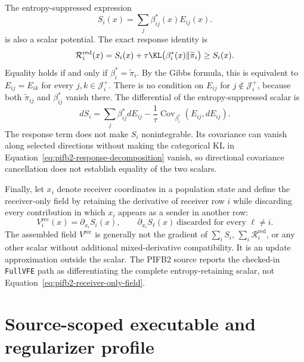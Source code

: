 The entropy-suppressed expression
\begin{equation}
S_i(x)=\sum_j\beta_{ij}^*(x)E_{ij}(x).
\label{eq:pifb2-entropy-suppressed-scalar}
\end{equation}
is also a scalar potential. The exact response identity is
\begin{equation}
\mathcal R_i^{\mathrm{red}}(x)
=S_i(x)+\tau\KL\bigl(\beta_i^*(x)\Vert\widetilde\pi_i\bigr)
\geq S_i(x).
\label{eq:pifb2-response-decomposition}
\end{equation}
Equality holds if and only if \(\beta_i^*=\widetilde\pi_i\). By the Gibbs formula, this is equivalent to \(E_{ij}=E_{ik}\) for every \(j,k\in\mathcal J_i^+\). There is no condition on \(E_{ij}\) for \(j\notin\mathcal J_i^+\), because both \(\widetilde\pi_{ij}\) and \(\beta_{ij}^*\) vanish there. The differential of the entropy-suppressed scalar is
\begin{equation}
dS_i
=\sum_j\beta_{ij}^*dE_{ij}
-\frac{1}{\tau}
\operatorname{Cov}_{\beta_i^*}(E_{ij},dE_{ij}).
\label{eq:pifb2-entropy-suppressed-differential}
\end{equation}
The response term does not make \(S_i\) nonintegrable. Its covariance can vanish along selected directions without making the categorical KL in Equation~\eqref{eq:pifb2-response-decomposition} vanish, so directional covariance cancellation does not establish equality of the two scalars.

Finally, let \(x_i\) denote receiver coordinates in a population state and define the receiver-only field by retaining the derivative of receiver row \(i\) while discarding every contribution in which \(x_i\) appears as a sender in another row:
\begin{equation}
V_i^{\mathrm{rec}}(x)
=\partial_{x_i}S_i(x),
\qquad
\partial_{x_i}S_\ell(x)\ \text{discarded for every \(\ell\neq i\)}.
\label{eq:pifb2-receiver-only-field}
\end{equation}
The assembled field \(V^{\mathrm{rec}}\) is generally not the gradient of \(\sum_iS_i\), \(\sum_i\mathcal R_i^{\mathrm{red}}\), or any other scalar without additional mixed-derivative compatibility. It is an update approximation outside the scalar. The PIFB2 source reports the checked-in \texttt{FullVFE} path as differentiating the complete entropy-retaining scalar, not Equation~\eqref{eq:pifb2-receiver-only-field}.

\section{Source-scoped executable and regularizer profile}

